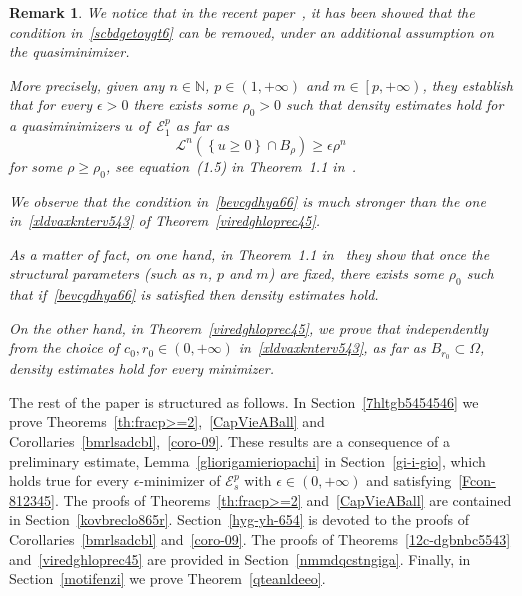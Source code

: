 \documentclass[12pt]{article}
\newcommand{\N}{\mathbb{N}}
\numberwithin{equation}{section}
\newtheorem{rem}[thm]{Remark}
\renewcommand{\geq}{\geqslant}
\begin{document}
\begin{rem}\label{removiult}
We notice that in the recent paper~\cite{savin2025density}, it has been showed that the condition in~\eqref{scbdgetoygt6} can be removed, under an additional assumption on the quasiminimizer. 

More precisely, given any $n\in\N$, $p\in (1,+\infty)$ and $m\in \left[p,+\infty\right)$, they establish that for every $\epsilon>0$ there exists some $\rho_0>0$ such that density estimates hold for a quasiminimizers $u$ of~$\mathcal{E}_1^p$  as far as 
\begin{equation}\label{bevcgdhya66}
\mathcal{L}^n\left( \left\lbrace u\geq 0 \right\rbrace    \cap B_{\rho} \right)\geq \epsilon \rho^n
\end{equation}
for some $\rho\geq \rho_0$, see equation~(1.5) in Theorem~1.1 in~\cite{savin2025density}. 

We observe that the condition in~\eqref{bevcgdhya66} is much stronger than the one in~\eqref{xldvaxknterv543} of Theorem~\ref{viredghloprec45}.

As a matter of fact, on one hand,  in Theorem~1.1 in~\cite{savin2025density}  they show that once the structural parameters (such as $n$, $p$ and $m$) are fixed, there exists some $\rho_0$ such that if~\eqref{bevcgdhya66} is satisfied then density estimates hold. 

On the other hand, in Theorem~\ref{viredghloprec45}, we prove that independently from the choice of $c_0,r_0\in (0,+\infty)$ in~\eqref{xldvaxknterv543}, as far as $B _{r_0}\subset\Omega$, density estimates hold for every minimizer.
\end{rem}




















\medskip

The rest of the paper is structured as follows. In Section~\ref{7hltgb5454546} we prove Theorems~\ref{th:fracp>=2},~\ref{CapVieABall} and Corollaries~\ref{bmrlsadcbl},~\ref{coro-09}. These results are a consequence of a preliminary estimate, Lemma~\ref{gliorigamieriopachi} in  Section~\ref{gi-i-gio}, which holds true for every  $\epsilon$-minimizer of $\mathcal{E}_s^p$ with $\epsilon\in (0,+\infty)$ and satisfying~\eqref{Fcon-812345}. The proofs of Theorems~\ref{th:fracp>=2} and~\ref{CapVieABall} are contained in Section~\ref{kovbreclo865r}. Section~\ref{hyg-yh-654} is devoted to the proofs of  Corollaries~\ref{bmrlsadcbl} and~\ref{coro-09}. The proofs of Theorems~\ref{12c-dgbnbc5543} and~\ref{viredghloprec45} are provided in Section~\ref{nmmdqcstngiga}. Finally, in Section~\ref{motifenzi} we prove Theorem~\ref{qteanldeeo}.   
\end{document}
